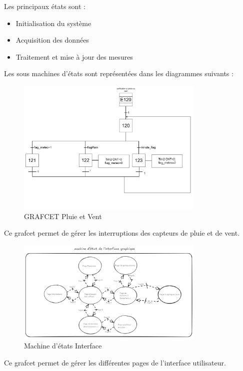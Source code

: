 \documentclass[12pt]{article}
\begin{document}
Les principaux états sont :
\begin{itemize}
    \item Initialisation du système
    \item Acquisition des données
    \item Traitement et mise à jour des mesures
\end{itemize}

Les sous machines d'états sont représentées dans les diagrammes suivants :

\begin{figure}[H]
    \capstart
    \centering
    \includegraphics[width=0.8\textwidth]{./images/grafcet_pluie_vent.png}
    \caption{GRAFCET Pluie et Vent}
    \label{fig:grafcet_pluie_vent}
\end{figure}
Ce grafcet permet de gérer les interruptions des capteurs de pluie et de vent.

\begin{figure}[H]
    \capstart
    \centering
    \includegraphics[width=0.8\textwidth]{./images/machine_detats_interface.png}
    \caption{Machine d'états Interface}
    \label{fig:machine_etats_interface}
\end{figure}

Ce grafcet permet de gérer les différentes pages de l'interface utilisateur.
\end{document}
